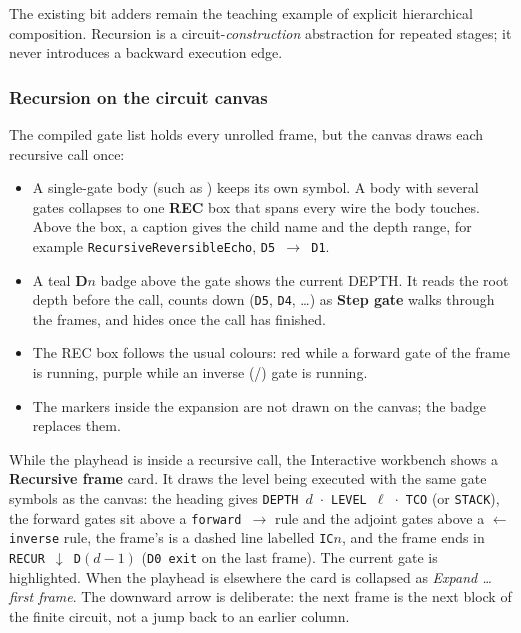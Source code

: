 The existing bit adders remain the teaching example of explicit hierarchical
composition. Recursion is a circuit-\emph{construction} abstraction for
repeated stages; it never introduces a backward execution edge.

\subsubsection{Recursion on the circuit canvas}

The compiled gate list holds every unrolled frame, but the canvas draws each
recursive call once:
\begin{itemize}
  \item A single-gate body (such as ) keeps its own symbol.
  A body with several gates collapses to one \textbf{REC} box that spans every
  wire the body touches. Above the box, a caption gives the child name and the
  depth range, for example \texttt{RecursiveReversibleEcho}, \texttt{D5 $\rightarrow$ D1}.
  \item A teal \textbf{D$n$} badge above the gate shows the current DEPTH. It
  reads the root depth before the call, counts down (\texttt{D5}, \texttt{D4},
  \ldots) as \textbf{Step gate} walks through the frames, and hides once the
  call has finished.
  \item The REC box follows the usual colours: red while a forward gate of the
  frame is running, purple while an inverse (/) gate is
  running.
  \item The  markers inside the expansion are not drawn on
  the canvas; the badge replaces them.
\end{itemize}

While the playhead is inside a recursive call, the Interactive workbench shows
a \textbf{Recursive frame} card. It draws the level being executed with the
same gate symbols as the canvas: the heading gives
\texttt{DEPTH $d$ $\cdot$ LEVEL $\ell$ $\cdot$ TCO} (or \texttt{STACK}), the forward
gates sit above a \texttt{forward $\rightarrow$} rule and the adjoint gates above a
\texttt{$\leftarrow$ inverse} rule, the frame's  is a dashed line
labelled \texttt{IC$n$}, and the frame ends in \texttt{RECUR $\downarrow$ D$(d-1)$}
(\texttt{D0 exit} on the last frame). The current gate is highlighted. When the
playhead is elsewhere the card is collapsed as \emph{Expand \ldots{} first
frame}. The downward arrow is deliberate: the next frame is the next block of
the finite circuit, not a jump back to an earlier column.

